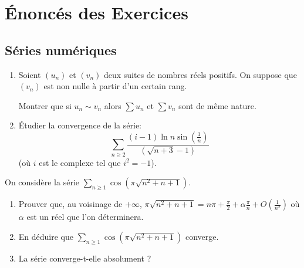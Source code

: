 \section{Énoncés des Exercices}
\subsection{Séries numériques}

\begin{exercice}
\begin{enumerate}
    \item Soient $(u_{n})$ et $(v_{n})$ deux suites de nombres réels positifs.
        On suppose que $(v_{n})$ est non nulle à partir d'un certain rang.
        
        Montrer que si $u_n \sim v_n$ alors $\sum u_n$ et $\sum v_n$ sont de même nature.

    \item Étudier la convergence de la série:
        \[\sum_{n\ge2}\frac{(i-1)\ln n \sin\left(\frac{1}{n}\right)}{(\sqrt{n+3}-1)}\]
        (où $i$ est le complexe tel que $i^2 = -1$).
\end{enumerate}
\end{exercice}

\begin{exercice}
    On considère la série $\sum_{n\ge1}\cos\left(\pi\sqrt{n^{2}+n+1}\right)$.
    \begin{enumerate}
        \item Prouver que, au voisinage de $+\infty$, $\pi\sqrt{n^{2}+n+1}=n\pi+\frac{\pi}{2}+\alpha\frac{\pi}{n}+O\left(\frac{1}{n^{2}}\right)$ 
            où $\alpha$ est un réel que l'on déterminera.
        \item En déduire que $\sum_{n\ge1}\cos\left(\pi\sqrt{n^{2}+n+1}\right)$ converge.
        \item La série converge-t-elle absolument ?
    \end{enumerate}
\end{exercice}

